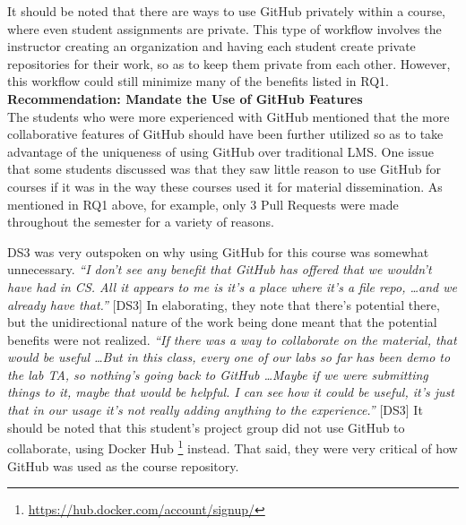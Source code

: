 It should be noted that there are ways to use GitHub privately within a course, where even student assignments are private. This type of workflow involves the instructor creating an organization and having each student create private repositories for their work, so as to keep them private from each other. However, this workflow could still minimize many of the benefits listed in RQ1. \\


\textbf{Recommendation: Mandate the Use of GitHub Features} \\
The students who were more experienced with GitHub mentioned that the more collaborative features of GitHub should have been further utilized so as to take advantage of the uniqueness of using GitHub over traditional LMS. One issue that some students discussed was that they saw little reason to use GitHub for courses if it was in the way these courses used it for material dissemination. As mentioned in RQ1 above, for example, only 3 Pull Requests were made throughout the semester for a variety of reasons.

DS3 was very outspoken on why using GitHub for this course was somewhat unnecessary. \textit{``I don't see any benefit that GitHub has offered that we wouldn't have had in CS. All it appears to me is it's a place where it's a file repo, \ldots and we already have that.''} [DS3] In elaborating, they note that there's potential there, but the unidirectional nature of the work being done meant that the potential benefits were not realized. \textit{``If there was a way to collaborate on the material, that would be useful \ldots But in this class, every one of our labs so far has been demo to the lab TA, so nothing's going back to GitHub \ldots Maybe if we were submitting things to it, maybe that would be helpful. I can see how it could be useful, it's just that in our usage it's not really adding anything to the experience.''} [DS3] It should be noted that this student's project group did not use GitHub to collaborate, using Docker Hub \footnote{\url{https://hub.docker.com/account/signup/}} instead. That said, they were very critical of how GitHub was used as the course repository.

